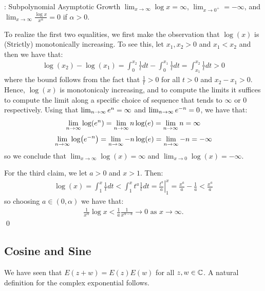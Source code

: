 \begin{ntheorem}{: Subpolynomial Asymptotic Growth}{}
    $\lim_{x \rightarrow \infty} \log x = \infty$, $\lim_{x \rightarrow 0^+} = -\infty$, and $\lim_{x \rightarrow \infty} \frac{\log x}{x^\alpha} = 0$ if $\alpha > 0$.
\end{ntheorem}
\begin{nproof}
    To realize the first two equalities, we first make the observation that $\log(x)$ is (Strictly) monotonically increasing. To see this, let $x_1, x_2 > 0$ and $x_1 < x_2$ and then we have that:
    \begin{align*}
        \log(x_2) - \log(x_1) = \int_0^{x_2} \frac{1}{t}dt - \int_0^{x_1}\frac{1}{t}dt = \int_{x_1}^{x_2}\frac{1}{t}dt > 0
    \end{align*}
    where the bound follows from the fact that $\frac{1}{t} > 0$ for all $t > 0$ and $x_2 - x_1 > 0$. Hence, $\log(x)$ is monotonicaly increasing, and to compute the limits it suffices to compute the limit along a specific choice of sequence that tends to $\infty$ or $0$ respectively. Using that $\lim_{n \rightarrow \infty} e^n = \infty$ and $\lim_{n \rightarrow \infty} e^{-n} = 0$, we have that:
    \begin{align*}
        \lim_{n \rightarrow \infty} \log(e^n) = \lim_{n \rightarrow \infty} n\log(e) = \lim_{n \rightarrow \infty} n = \infty
    \end{align*}
    \begin{align*}
        \lim_{n \rightarrow \infty} \log(e^{-n}) = \lim_{n \rightarrow \infty} -n\log(e) = \lim_{n \rightarrow \infty} -n = -\infty
    \end{align*}
    so we conclude that $\lim_{x \rightarrow \infty}\log(x) = \infty$ and $\lim_{x \rightarrow 0} \log(x) = -\infty$.

    For the third claim, we let $a > 0$ and $x > 1$. Then:
    \begin{align*}
        \log(x) = \int_1^x \frac{1}{t}dt < \int_1^x t^a\frac{1}{t}dt = \left.\frac{t^a}{a}\right|_{1}^x = \frac{x^a}{a} - \frac{1}{a} < \frac{x^a}{a}
    \end{align*}
    so choosing $a \in (0, \alpha)$ we have that:
    \begin{align*}
        \frac{1}{x^\alpha}\log x < \frac{1}{a}\frac{1}{x^{\alpha - a}} \rightarrow 0 \text{ as } x \rightarrow \infty.
    \end{align*}\qed
\end{nproof}

\subsection{Cosine and Sine}
We have seen that $E(z+w) = E(z)E(w)$ for all $z, w \in \mathbb{C}$. A natural definition for the complex exponential follows.

